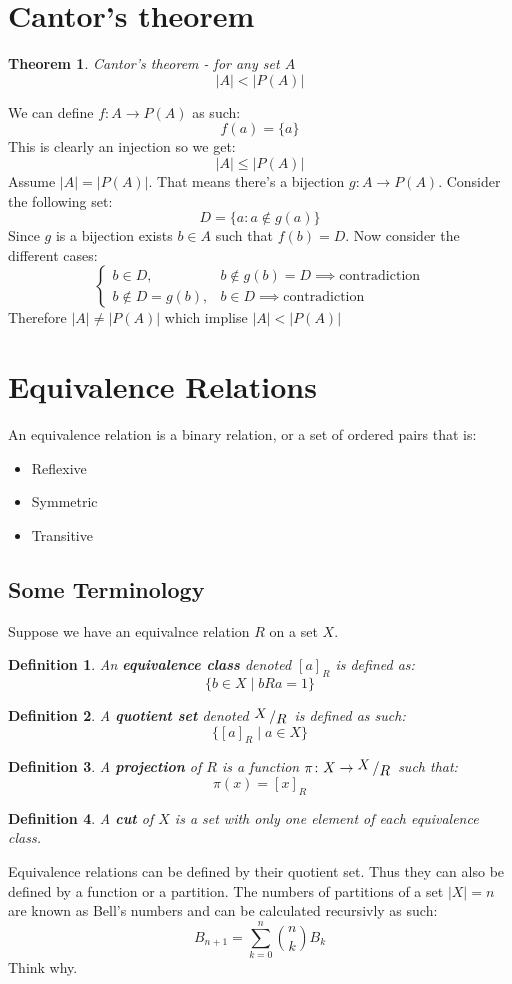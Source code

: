 \documentclass{article}
\theoremstyle{plain}
\newtheorem{theorem}{Theorem}[section]
\newtheorem{definition}{Definition}[section]
\newcommand{\bigslant}[2]
{{\raisebox{.2em}{$#1$}\left/\raisebox{-.2em}{$#2$}\right.}}
\begin{document}
	\newpage
	\section{Cantor's theorem}
	\begin{theorem}
	Cantor's theorem - for any set $A$
	\[
		|A| < |P(A)|
	\]
	\end{theorem}
	\noindent We can define $f \colon A \to P(A)$ as such:
	\[
		f(a) = \{a\}
	\]
	This is clearly an injection so we get:
	\[
		 |A| \le |P(A)|
	\]
	Assume $|A|=|P(A)|$. 
	That means there's a bijection $g \colon A \to P(A)$. Consider the 
	following set:
	\[
		D = \{ a : a \notin g(a)\}
	\]
	Since $g$ is a bijection exists $b\in A$ such that $f(b)=D$. Now  
	consider the different cases:
	\[
		\begin{cases}
		b\in D, & b\notin g(b)=D \implies \text{contradiction} \\
		b\notin D=g(b), & b\in D \implies \text{contradiction}
		\end{cases}
	\]
	Therefore $|A| \neq |P(A)|$ which implise $|A| < |P(A)|$
		
		
\newpage
	\section{Equivalence Relations}
	An equivalence relation is a binary relation, or a set of ordered pairs 
	that is:
	\begin{itemize}
	\item Reflexive
	\item Symmetric
	\item Transitive
	\end{itemize}
	
	\subsection{Some Terminology}
		Suppose we have an equivalnce relation $R$ on a set $X$.
		\begin{definition}
			An \textbf{equivalence class} denoted $[a]_R$ is defined
			as:
			\[
				\{ b \in X \mid bRa = 1 \}
			\]
		\end{definition}
		\begin{definition}
			A \textbf{quotient set} denoted $\bigslant{X}{R}$ is defined as
			such:
			\[
				\{ [a]_R \mid a \in X \}
			\]
		\end{definition}
		\begin{definition}
			A \textbf{projection} of $R$ is a function 
			$\pi \colon X \to \bigslant{X}{R}$ such that:
			\[
				\pi(x) = [x]_R
			\]
		\end{definition}
		\begin{definition}
			A \textbf{cut} of $X$ is a set with only one element of each 
			equivalence class.
		\end{definition}
	\noindent Equivalence relations can be defined by their quotient set.
	Thus they can also be defined by a function or a partition.
	The numbers of partitions of a set $|X|=n$ are known as Bell's numbers 
	and can be calculated recursivly as such:
	\[
		B_{n+1} = \sum_{k=0}^{n}{n \choose k} B_k
	\]
	Think why.
	
\end{document}

